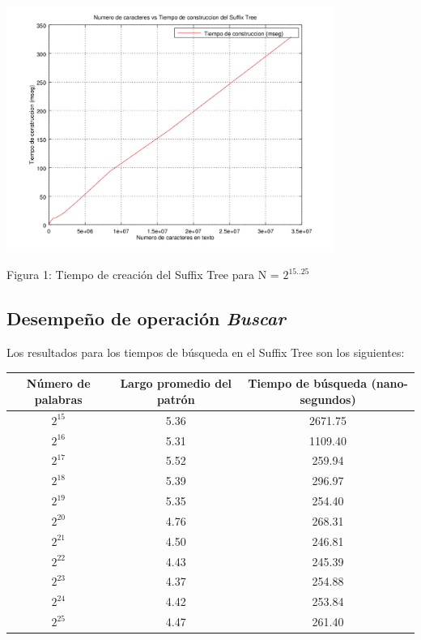 \documentclass[letterpaper,10pt]{article}
\begin{document}
	\begin{center}
		\includegraphics[width=0.8\textwidth]{fig1.png}

		Figura 1: Tiempo de creación del Suffix Tree para N = $2^{15..25}$
	\end{center}

	\newpage

	\subsection{Desempeño de operación \textit{Buscar}}

	Los resultados para los tiempos de búsqueda en el Suffix Tree son los siguientes:

	\begin{center}
		\begin{tabular}{|c|c|c|}
			\hline
			Número de palabras & Largo promedio del patrón & Tiempo de búsqueda (nano-segundos)\\
			\hline
			$2^{15}$ & 5.36 & 2671.75\\
			\hline
			$2^{16}$ & 5.31 & 1109.40\\
			\hline
			$2^{17}$ & 5.52 & 259.94\\
			\hline
			$2^{18}$ & 5.39 & 296.97\\
			\hline
			$2^{19}$ & 5.35 & 254.40\\
			\hline
			$2^{20}$ & 4.76 & 268.31\\
			\hline
			$2^{21}$ & 4.50 & 246.81\\
			\hline
			$2^{22}$ & 4.43 & 245.39\\
			\hline
			$2^{23}$ & 4.37 & 254.88\\
			\hline
			$2^{24}$ & 4.42 & 253.84\\
			\hline
			$2^{25}$ & 4.47 & 261.40\\
			\hline
		\end{tabular}
	\end{center}
\end{document}
